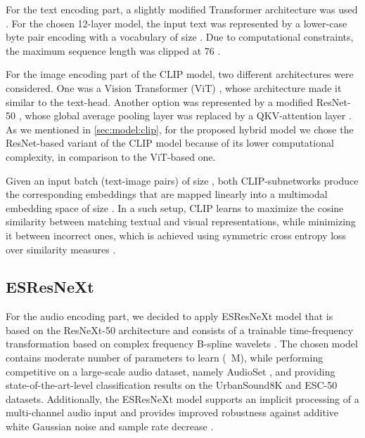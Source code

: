 \documentclass[runningheads]{llncs}
\begin{document}
For the text encoding part, a slightly modified \cite{radford2019transformer} Transformer \cite{vaswani2017attention} architecture was used \cite{radford2021clip}.
For the chosen 12-layer model, the input text was represented by a lower-case byte pair encoding with a vocabulary of size  \cite{radford2021clip}.
Due to computational constraints, the maximum sequence length was clipped at 76 \cite{radford2021clip}.

For the image encoding part of the \mbox{CLIP} model, two different architectures were considered.
One was a Vision Transformer (ViT) \cite{radford2021clip,dosovitskiy2020vit}, whose architecture made it similar to the text-head.
Another option was represented by a modified \mbox{ResNet-50} \cite{he2016resnet}, whose global average pooling layer was replaced by a QKV-attention layer \cite{radford2021clip}.
As we mentioned in \autoref{sec:model:clip}, for the proposed hybrid model we chose the ResNet-based variant of the CLIP model because of its lower computational complexity, in comparison to the ViT-based one.

Given an input batch (text-image pairs) of size , both CLIP-subnetworks produce the corresponding embeddings that are mapped linearly into a multimodal embedding space of size  \cite{radford2021clip}.
In a such setup, CLIP learns to maximize the cosine similarity between matching textual and visual representations, while minimizing it between incorrect ones, which is achieved using symmetric cross entropy loss over similarity measures \cite{radford2021clip}.

\subsection{ESResNeXt} \label{sec:model:esrnx}
For the audio encoding part, we decided to apply \mbox{ESResNeXt} model \cite{guzhov2021esrnx} that is based on the \mbox{ResNeXt-50} \cite{chollet2017resnext} architecture and consists of a trainable time-frequency transformation based on complex frequency B-spline wavelets \cite{teolis1998fbsp}.
The chosen model contains moderate number of parameters to learn (\mbox{ M}), while performing competitive on a large-scale audio dataset, namely \mbox{AudioSet} \cite{gemmeke2017audioset}, and providing state-of-the-art-level classification results on the \mbox{UrbanSound8K} \cite{salamon2014us8k} and \mbox{ESC-50} \cite{piczak2015esc} datasets.
Additionally, the ESResNeXt model supports an implicit processing of a multi-channel audio input and provides improved robustness against additive white Gaussian noise and sample rate decrease \cite{guzhov2021esrnx}.
\end{document}
